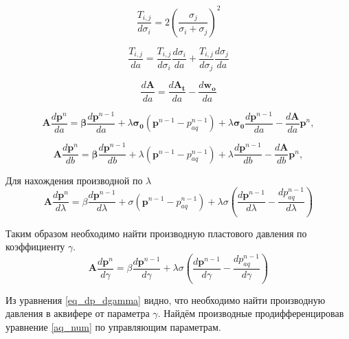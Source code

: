 \documentclass[14pt]{article}
\begin{document}
\begin{equation} \label{dTij_dsigma_i}
\frac{T_{i,j}}{d\sigma_i} = 2\left(\frac{\sigma_j}{{\sigma_i} + {\sigma_j}}\right)^2
\end{equation}

\begin{equation} \label{dTij_da}
\frac{T_{i,j}}{da} = \frac{T_{i,j}}{d\sigma_i}\frac{d\sigma_i}{da} + \frac{T_{i,j}}{d\sigma_j}\frac{d\sigma_j}{da}
\end{equation}


\begin{equation} \label{dT_da}
\frac{d\boldsymbol{A}}{da} = \frac{d\boldsymbol{A_t}}{da}-\frac{d\boldsymbol{w_o}}{da}
\end{equation}

\begin{equation} \label{eq_dp_da}
\boldsymbol{A}\frac{d\boldsymbol{p}^n}{da} = \boldsymbol{\beta}\frac{d\boldsymbol{p}^{n-1}}{da} + \lambda\boldsymbol{\sigma_0}(\boldsymbol{p}^{n-1}-p_{aq}^{n-1})+\lambda\boldsymbol{\sigma_0}\frac{d\boldsymbol{p}^{n-1}}{da}-\frac{d\boldsymbol{A}}{da}\boldsymbol{p}^n,
\end{equation}

\begin{equation} \label{eq_dp_db}
\boldsymbol{A}\frac{d\boldsymbol{p}^n}{db} = \boldsymbol{\beta}\frac{d\boldsymbol{p}^{n-1}}{db} + \lambda(\boldsymbol{p}^{n-1}-p_{aq}^{n-1})+\lambda\frac{d\boldsymbol{p}^{n-1}}{db}-\frac{d\boldsymbol{A}}{db}\boldsymbol{p}^n,
\end{equation}

Для нахождения производной по $ \lambda $
\begin{equation} \label{rp}
\boldsymbol{A}\frac{d\boldsymbol{p}^n}{d\lambda} = \beta\frac{d\boldsymbol{p}^{n-1}}{d\lambda} + \sigma(\boldsymbol{p}^{n-1}-p_{aq}^{n-1})+\lambda\sigma(\frac{d\boldsymbol{p}^{n-1}}{d\lambda}-\frac{dp_{aq}^{n-1}}{d\lambda})
\end{equation}

  Таким образом необходимо найти производную пластового давления по коэффициенту $ \gamma $.
\begin{equation} \label{eq_dp_dgamma}
\boldsymbol{A}\frac{d\boldsymbol{p}^n}{d\gamma} = \beta\frac{d\boldsymbol{p}^{n-1}}{d\gamma} + \lambda\sigma(\frac{d\boldsymbol{p}^{n-1}}{d\gamma}-\frac{dp_{aq}^{n-1}}{d\gamma})
\end{equation}

Из уравнения \ref{eq_dp_dgamma} видно, что необходимо найти производную давления в аквифере от параметра $ \gamma $. Найдём производные продифференцировав уравнение \ref{aq_num} по управляющим параметрам.
\end{document}
